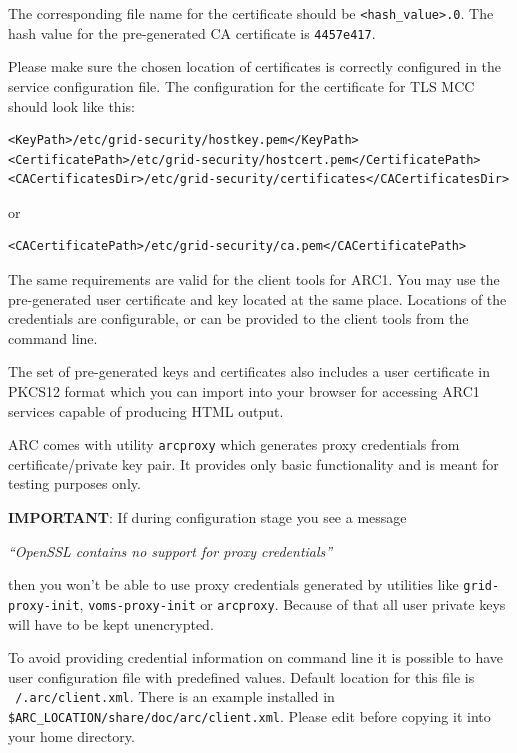 \documentclass{article}                            %
\begin{document}
The corresponding file name for the certificate should be
\texttt{<hash\_value>.0}. The hash value for the pre-generated CA certificate is
\texttt{4457e417}.

Please make sure the chosen location of certificates is correctly configured in
the service configuration file. The configuration for the certificate for TLS
MCC should look like this:

\begin{lstlisting}
<KeyPath>/etc/grid-security/hostkey.pem</KeyPath>
<CertificatePath>/etc/grid-security/hostcert.pem</CertificatePath>
<CACertificatesDir>/etc/grid-security/certificates</CACertificatesDir>
\end{lstlisting}

or

\begin{lstlisting}
<CACertificatePath>/etc/grid-security/ca.pem</CACertificatePath>
\end{lstlisting}

The same requirements are valid for the client tools for ARC1. You may use the
pre-generated user certificate and key located at the same place. Locations of
the credentials are configurable, or can be provided to the client tools from
the command line.

The set of pre-generated keys and certificates also includes a user certificate
in PKCS12 format which you can import into your browser for accessing ARC1
services capable of producing HTML output.

ARC comes with utility \texttt{arcproxy} which generates proxy credentials from
certificate/private key pair. It provides only basic functionality and is meant
for testing purposes only.

\begin{framed}
\textbf{IMPORTANT}: If during configuration stage you see a message

 \textit{``OpenSSL contains no support for proxy credentials''}

then you won't be able to use proxy credentials generated by utilities
like \texttt{grid-proxy-init}, \texttt{voms-proxy-init} or \texttt{arcproxy}.
Because of that all user private keys will have to be kept unencrypted.
\end{framed}

To avoid providing credential information on command line it is possible to have
user configuration file with predefined values. Default location for this file
is \texttt{~/.arc/client.xml}. There is an example installed in
\verb|$ARC_LOCATION/share/doc/arc/client.xml|. Please edit before copying it
into your home directory.
\end{document}
